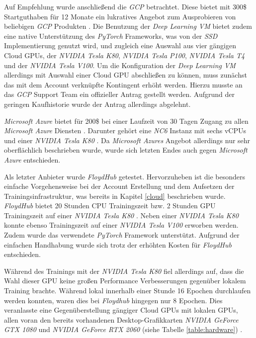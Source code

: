 Auf Empfehlung wurde anschließend die \textit{GCP} betrachtet. Diese bietet mit 300\$ Startguthaben für 12 Monate ein lukratives Angebot zum Ausprobieren von beliebigen \textit{GCP} Produkten \cite{GoogleCloudPlatform.20200314b}. Die Benutzung der \textit{Deep Learning VM} bietet zudem eine native Unterstützung des \textit{PyTorch} Frameworks, was von der \textit{SSD} Implementierung genutzt wird, und zugleich eine Auswahl aus vier gängigen Cloud GPUs, der \textit{NVIDIA Tesla K80}, \textit{NVIDIA Tesla P100}, \textit{NVIDIA Tesla T4} und der \textit{NVIDIA Tesla V100}. Um die Konfiguration der \textit{Deep Learning VM} allerdings mit Auswahl einer Cloud GPU abschließen zu können, muss zunächst das mit dem Account verknüpfte Kontingent erhöht werden. Hierzu musste an das \textit{GCP} Support Team ein offizieller Antrag gestellt werden. Aufgrund der geringen Kaufhistorie wurde der Antrag allerdings abgelehnt. 

\textit{Microsoft Azure} bietet für 200\$ bei einer Laufzeit von 30 Tagen Zugang zu allen \textit{Microsoft Azure} Diensten \cite{MicrosoftAzure.2020}. Darunter gehört eine \textit{NC6} Instanz mit sechs vCPUs und einer \textit{NVIDIA Tesla K80} \cite{MicrosoftAzure.202003124}. Da \textit{Microsoft Azures} Angebot allerdings nur sehr oberflächlich beschrieben wurde, wurde sich letzten Endes auch gegen \textit{Microsoft Azure} entschieden. 

Als letzter Anbieter wurde \textit{FloydHub} getestet. Hervorzuheben ist die besonders einfache Vorgehensweise bei der Account Erstellung und dem Aufsetzen der Trainingsinfrastruktur, was bereits in Kapitel \ref{cloud} beschrieben wurde. \textit{FloydHub} bietet 20 Stunden CPU Trainingszeit bzw. 2 Stunden GPU Trainingszeit auf einer \textit{NVIDIA Tesla K80} \cite{FloydHub.2020}. Neben einer \textit{NVIDIA Tesla K80} konnte ebenso Trainingszeit auf einer \textit{NVIDIA Tesla V100} erworben werden. Zudem wurde das verwendete \textit{PyTorch} Framework unterstützt. Aufgrund der einfachen Handhabung wurde sich trotz der erhöhten Kosten für \textit{FloydHub} entschieden. 

Während des Trainings mit der \textit{NVIDIA Tesla K80} fiel allerdings auf, dass die Wahl dieser GPU keine großen Performance Verbesserungen gegenüber lokalem Training brachte. Während lokal innerhalb einer Stunde 16 Epochen durchlaufen werden konnten, waren dies bei \textit{Floydhub} hingegen nur 8 Epochen. Dies veranlasste eine Gegenüberstellung gängiger Cloud GPUs mit lokalen GPUs, allen voran den bereits vorhandenen Desktop-Grafikkarten \textit{NVIDIA GeForce GTX 1080} und \textit{NVIDIA GeForce RTX 2060} (siehe Tabelle \ref{table:hardware}) \cite{TechPowerUp.20200209}.

